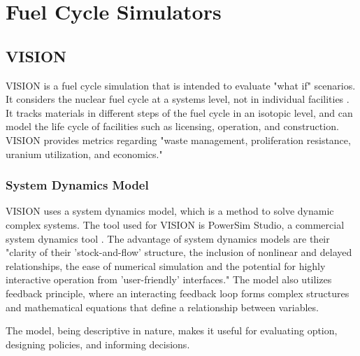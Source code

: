 \section{Fuel Cycle Simulators}

\subsection{\gls{VISION}}
\gls{VISION} is a fuel cycle simulation
that is intended to evaluate "what if" scenarios.
It considers the nuclear fuel cycle at a systems level,
not in individual facilities \cite{jacobson_user_2011}.
It tracks materials in different steps of the fuel cycle in an isotopic level,
and can model the life cycle of facilities such as licensing, operation, and
construction. \gls{VISION} provides metrics regarding "waste management,
proliferation resistance, uranium utilization, and economics\cite{jacobson_vision:_2006}."

\subsubsection{System Dynamics Model}
\gls{VISION} uses a system dynamics model, which is a
method to solve dynamic complex systems. The tool used
for \gls{VISION} is PowerSim Studio, a commercial
system dynamics tool \cite{yacout_vision_2006}. The advantage of system dynamics
models are their "clarity of their 'stock-and-flow' structure,
the inclusion of nonlinear and delayed relationships, the
ease of numerical simulation and the potential for highly
interactive operation from 'user-friendly' interfaces." 
The model also utilizes feedback principle, where an interacting
feedback loop forms complex structures and mathematical
equations that define a relationship between variables.

The model, being descriptive in nature, makes it useful for
evaluating option, designing policies, and informing decisions.
